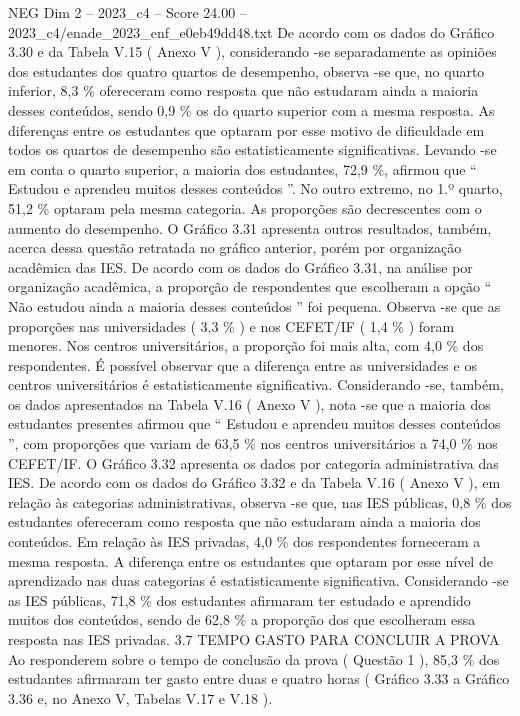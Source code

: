 \begin{textsample}{NEG Dim 2 – 2023\_c4 – Score 24.00 – 2023\_c4/enade\_2023\_enf\_e0eb49dd48.txt}
De acordo com os dados do Gráfico 3.30 e da Tabela V.15 ( Anexo V ), considerando -se separadamente as opiniões dos estudantes dos quatro quartos de desempenho, observa -se que, no quarto inferior, 8,3 \% ofereceram como resposta que não estudaram ainda a maioria desses conteúdos, sendo 0,9 \% os do quarto superior com a mesma resposta.
As diferenças entre os estudantes que optaram por esse motivo de dificuldade em todos os quartos de desempenho são estatisticamente significativas.
Levando -se em conta o quarto superior, a maioria dos estudantes, 72,9 \%, afirmou que “ Estudou e aprendeu muitos desses conteúdos ”.
No outro extremo, no 1.º quarto, 51,2 \% optaram pela mesma categoria.
As proporções são decrescentes com o aumento do desempenho.
O Gráfico 3.31 apresenta outros resultados, também, acerca dessa questão retratada no gráfico anterior, porém por organização acadêmica das IES.
De acordo com os dados do Gráfico 3.31, na análise por organização acadêmica, a proporção de respondentes que escolheram a opção “ Não estudou ainda a maioria desses conteúdos ” foi pequena.
Observa -se que as proporções nas universidades ( 3,3 \% ) e nos CEFET/IF ( 1,4 \% ) foram menores.
Nos centros universitários, a proporção foi mais alta, com 4,0 \% dos respondentes.
É possível observar que a diferença entre as universidades e os centros universitários é estatisticamente significativa.
Considerando -se, também, os dados apresentados na Tabela V.16 ( Anexo V ), nota -se que a maioria dos estudantes presentes afirmou que “ Estudou e aprendeu muitos desses conteúdos ”, com proporções que variam de 63,5 \% nos centros universitários a 74,0 \% nos CEFET/IF.
O Gráfico 3.32 apresenta os dados por categoria administrativa das IES.
De acordo com os dados do Gráfico 3.32 e da Tabela V.16 ( Anexo V ), em relação às categorias administrativas, observa -se que, nas IES públicas, 0,8 \% dos estudantes ofereceram como resposta que não estudaram ainda a maioria dos conteúdos.
Em relação às IES privadas, 4,0 \% dos respondentes forneceram a mesma resposta.
A diferença entre os estudantes que optaram por esse nível de aprendizado nas duas categorias é estatisticamente significativa.
Considerando -se as IES públicas, 71,8 \% dos estudantes afirmaram ter estudado e aprendido muitos dos conteúdos, sendo de 62,8 \% a proporção dos que escolheram essa resposta nas IES privadas. 3.7 TEMPO GASTO PARA CONCLUIR A PROVA Ao responderem sobre o tempo de conclusão da prova ( Questão 1 ), 85,3 \% dos estudantes afirmaram ter gasto entre duas e quatro horas ( Gráfico 3.33 a Gráfico 3.36 e, no Anexo V, Tabelas V.17 e V.18 ).

\end{textsample}
